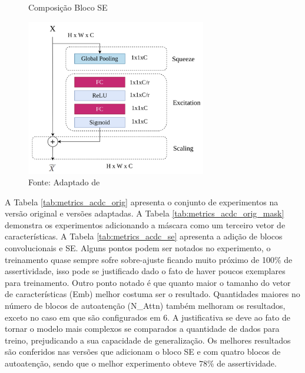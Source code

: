 \begin{figure}[h!]
    \centering
    \caption{Composição Bloco SE}
    \includegraphics[width=0.7\textwidth]{figures/fig031.png}
    \caption*{Fonte: Adaptado de \cite{lafraxoSEDARUnetSqueezeexcitationDilated2024}}
    \label{fig:fig031}
\end{figure}


A Tabela \ref{tab:metrics_acdc_orig} apresenta o conjunto de experimentos na versão original e versões adaptadas. A Tabela \ref{tab:metrics_acdc_orig_mask} demonstra os experimentos adicionando a máscara como um terceiro vetor de características. A Tabela \ref{tab:metrics_acdc_se} apresenta a adição de blocos convolucionais e  \gls{SE}. Alguns pontos podem ser notados no experimento, o treinamento quase sempre sofre sobre-ajuste ficando muito próximo de 100\% de assertividade, isso pode se justificado dado o fato de haver poucos exemplares para treinamento. Outro ponto notado é que quanto maior o tamanho do vetor de características (Emb) melhor costuma ser o resultado. Quantidades maiores no número de blocos de autoatenção (N\_Attn) também melhoram os resultados, exceto no caso em que são configurados em $6$. A justificativa se deve ao fato de tornar o modelo mais complexos se comparados a quantidade de dados para treino, prejudicando a sua capacidade de generalização. Os melhores resultados são conferidos nas versões que adicionam o bloco \gls{SE} e com quatro blocos de autoatenção, sendo que o melhor experimento obteve $78\%$ de assertividade.


